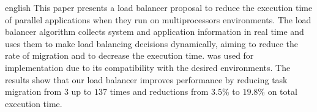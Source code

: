 \begin{resumo}[Abstract]
 \begin{otherlanguage*}{english}
This paper presents a load balancer proposal to reduce the execution time of  parallel applications when they run on multiprocessors environments. The load balancer algorithm collects system and application information in real time and uses them to make load balancing decisions dynamically, aiming to reduce the rate of migration and to decrease the execution time. \charm was used for implementation due to its compatibility with the desired environments. The results show that our load balancer improves performance by reducing task migration from $3$ up to $137$ times and reductions from  $3.5$\% to $19.8$\%  on total execution time.
\begin{comment}

\textbf{}
This paper deals with a topic that is much discussed at present, parallel and heterogeneous computing. It aims at comparing the performance and energy efficiency of components that fall into this category. For this, an Intel Xeon Phi coprocessor and an NVIDIA GPGPU will be compared. Before comparing them, a study of the NVIDIA GPU architectures and the Intel Xeon Phi coprocessor (Intel MIC) was needed, as well as some APIs and platforms that enable the implementation of these components. The comparison was performed using a benchmark, which was also studied. As a result, it was realized how efficient both components may be, in the case of Xeon Phi, that in the benchmark MaxFlops reached 5.06 TFlops for single precision values with an energy efficiency of 17,27 GFlops/W, and in NVIDIA GPGPU, which in the GEMM benchmark, reached 3.03 TFlops for single precision values and an energy efficiency of 13.18 GFlops/W. 

     \textbf {Keywords}: Parallel Computing, Heterogeneous Computing, High Performance Computing, CUDA, OpenCL, OpenMP, SHOC Benchmark Suite.
\end{comment}
 \end{otherlanguage*}
\end{resumo}